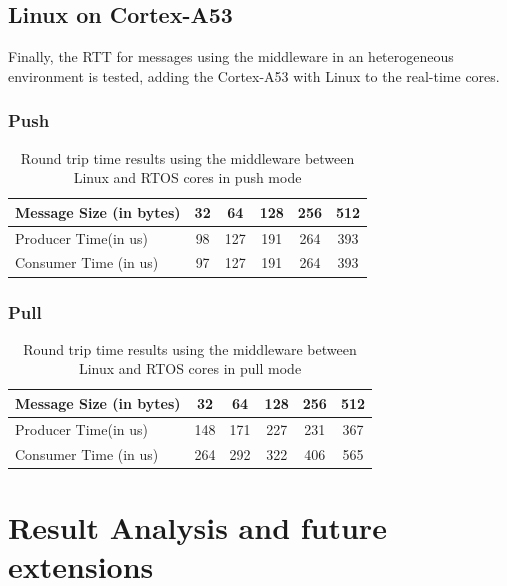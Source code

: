 \subsection{Linux on Cortex-A53}

Finally, the RTT for messages using the middleware in an heterogeneous
environment is tested, adding the Cortex-A53 with Linux to the real-time cores.

\subsubsection{Push}

\begin{table}[H]
\centering
\caption{Round trip time results using the middleware between Linux and RTOS
    cores in push mode}
\label{table:broker_communication_linux_RTOS_cores_push}
\begin{tabular}{lccccc}
\toprule
Message Size (in bytes) & 32 & 64 & 128 & 256 & 512 \\
\midrule
Producer Time(in us) & 98 & 127 & 191 & 264 & 393 \\
Consumer Time (in us) & 97 & 127 & 191 & 264 & 393 \\
\bottomrule
\end{tabular}
\end{table}

\subsubsection{Pull}

\begin{table}[H]
\centering
\caption{Round trip time results using the middleware between Linux and RTOS
    cores in pull mode}
\label{table:broker_communication_linux_RTOS_cores_pull}
\begin{tabular}{lccccc}
\toprule
Message Size (in bytes) & 32 & 64 & 128 & 256 & 512 \\
\midrule
Producer Time(in us) & 148 & 171 & 227 & 231 & 367 \\
Consumer Time (in us) & 264 & 292 & 322 & 406 & 565 \\
\bottomrule
\end{tabular}
\end{table}

\section{Result Analysis and future extensions}

